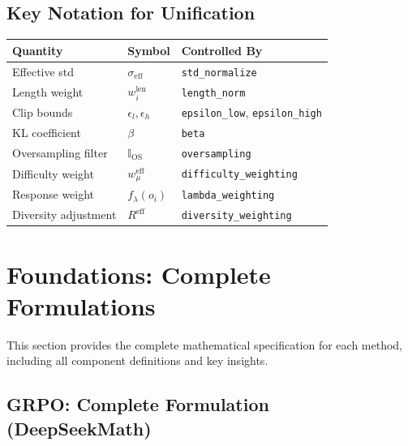\documentclass[11pt,a4paper]{article}
\begin{document}
\subsection{Key Notation for Unification}

\begin{center}
\begin{tabular}{@{}lll@{}}
\toprule
\textbf{Quantity} & \textbf{Symbol} & \textbf{Controlled By} \\
\midrule
Effective std & $\sigma_{\text{eff}}$ & \texttt{std\_normalize} \\
Length weight & $w_i^{\text{len}}$ & \texttt{length\_norm} \\
Clip bounds & $\epsilon_l, \epsilon_h$ & \texttt{epsilon\_low}, \texttt{epsilon\_high} \\
KL coefficient & $\beta$ & \texttt{beta} \\
Oversampling filter & $\mathbb{I}_{\text{OS}}$ & \texttt{oversampling} \\
Difficulty weight & $w_\mu^{\text{eff}}$ & \texttt{difficulty\_weighting} \\
Response weight & $f_\lambda(o_i)$ & \texttt{lambda\_weighting} \\
Diversity adjustment & $R^{\text{eff}}$ & \texttt{diversity\_weighting} \\
\bottomrule
\end{tabular}
\end{center}

\newpage


\section{Foundations: Complete Formulations}

This section provides the complete mathematical specification for each method, including all component definitions and key insights.

\subsection{GRPO: Complete Formulation (DeepSeekMath)}
\end{document}

